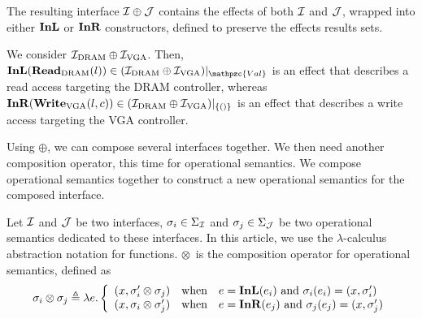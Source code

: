 The resulting interface $\mathcal{I} \oplus \mathcal{J}$ contains the effects of both $\mathcal{I}$ and
$\mathcal{J}$, wrapped into either $\mathbf{\mathbf{InL}}$ or $\mathbf{\mathbf{InR}}$ constructors, defined to
preserve the effects results sets.
%

\begin{example}
We consider $\mathcal{I}_{\mathrm{DRAM}} \oplus \mathcal{I}_{\mathrm{VGA}}$. Then,
$\func{InL}(\func{Read}_{\mathrm{DRAM}}(l)) \in \Interface{(\I_{\mathrm{DRAM}}
\oplus \I_{\mathrm{VGA}})}{\mathpzc{Val}}$ is an effect that describes a
read access targeting the DRAM controller, whereas
$\mathbf{\mathbf{InR}}(\mathbf{\mathbf{Write}}_{\mathrm{VGA}}(l, c)) \in (\mathcal{I}_{\mathrm{DRAM}}
\oplus \mathcal{I}_{\mathrm{VGA}})|_{\{()\}}$ is an effect that describes a
write access targeting the VGA controller.
\end{example}

Using $\oplus$, we can compose several interfaces together.
%
We then need another composition operator, this time for operational semantics.
%
We compose operational semantics together to construct a new operational
semantics for the composed interface.

\begin{definition} \label{def:freespec:semantics-composition}
  Let $\mathcal{I}$ and $\mathcal{J}$ be two interfaces,
  $\sigma_i \in \Sigma_{\mathcal{I}}$ and $\sigma_j \in \Sigma_{\mathcal{J}}$ be two
  operational semantics dedicated to these interfaces.
  In this article, we use the $\lambda$-calculus abstraction notation for
  functions.
  $\otimes$~is the composition operator for operational semantics, defined as
  \[ \sigma_i \otimes \sigma_j \triangleq \lambda e. \left \{
      \begin{array}{lcl}
        (x, \sigma_i' \otimes \sigma_j) & \text{when} & e =
                                                         \mathbf{\mathbf{InL}}(e_i)
                                                         \text{ and }
                                                         \sigma_i(e_i)
                                                         = (x,
                                                         \sigma_i') \\
        (x, \sigma_i \otimes \sigma_j') & \text{when} & e =
                                                         \mathbf{\mathbf{InR}}(e_j)
                                                         \text{ and }
                                                         \sigma_j(e_j)
                                                         = (x, \sigma_j')
      \end{array}
    \right.
  \]
\end{definition}

